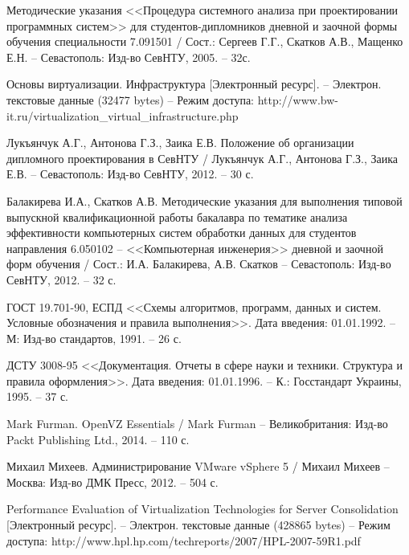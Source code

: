 \begin{thebibliography}{00}
    Методические указания <<Процедура системного анализа при проектировании программных систем>>
    для студентов-дипломников дневной и заочной формы обучения специальности 7.091501 /
    Сост.: Сергеев Г.Г., Скатков А.В., Мащенко Е.Н. -- Севастополь:
    Изд-во СевНТУ, 2005. -- 32с.

    Основы виртуализации. Инфраструктура
    [Электронный ресурс]. --
    Электрон. текстовые данные (32477 bytes) --
    Режим доступа: http://www.bw-it.ru/virtualization\_virtual\_infrastructure.php


 Лукъянчук А.Г., Антонова Г.З., Заика Е.В. 
    Положение об организации дипломного проектирования в СевНТУ / 
    Лукъянчук А.Г., Антонова Г.З., Заика Е.В. -- Севастополь: 
    Изд-во СевНТУ, 2012. -- 30 с.

    Балакирева И.А., Скатков А.В. 
    Методические указания для выполнения типовой выпускной 
    квалификационной работы бакалавра по тематике анализа эффективности 
    компьютерных систем обработки данных для студентов направления 
    6.050102 -- <<Компьютерная инженерия>> дневной и заочной форм обучения / 
    Сост.: И.А. Балакирева, А.В. Скатков -- Севастополь: Изд-во СевНТУ, 2012. -- 32 с.

    ГОСТ 19.701-90, ЕСПД <<Схемы алгоритмов, программ, данных и систем. 
    Условные обозначения и правила выполнения>>. 
    Дата введения: 01.01.1992. -- М: Изд-во стандартов, 1991. -- 26 с.

    ДСТУ 3008-95 <<Документация. Отчеты в сфере науки и техники. 
    Структура и правила оформления>>. 
    Дата введения: 01.01.1996. -- К.: Госстандарт Украины, 1995. -- 37 с.

    Mark Furman. OpenVZ Essentials /
    Mark Furman -- Великобритания: Изд-во Packt Publishing Ltd.,
    2014. -- 110 с.

    Михаил Михеев. Администрирование VMware vSphere 5 / 
    Михаил Михеев -- Москва: Изд-во ДМК Пресс, 
    2012. -- 504 с.
    
    Performance Evaluation of Virtualization Technologies for Server Consolidation
    [Электронный ресурс]. --
    Электрон. текстовые данные (428865 bytes) --
    Режим доступа: http://www.hpl.hp.com/techreports/2007/HPL-2007-59R1.pdf


\end{thebibliography}
